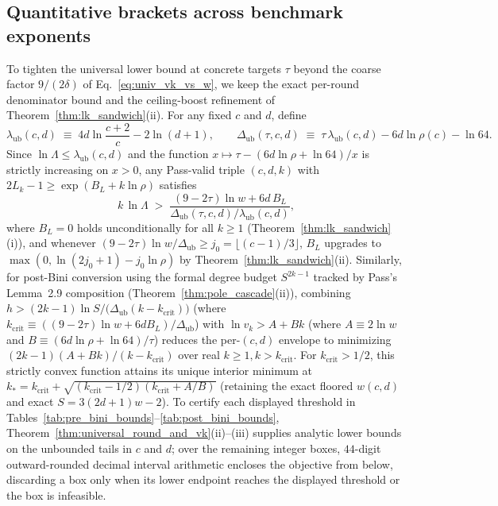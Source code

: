 \documentclass[11pt,a4paper]{article}
\theoremstyle{plain}
\theoremstyle{definition}
\theoremstyle{remark}
\begin{document}
\subsection{Quantitative brackets across benchmark exponents}
\label{subsec:quantitative_tables}

To tighten the universal lower bound at concrete targets $\tau$ beyond the coarse factor $9/(2\delta)$ of Eq.~\eqref{eq:univ_vk_vs_w}, we keep the exact per-round denominator bound and the ceiling-boost refinement of Theorem~\ref{thm:lk_sandwich}(ii). For any fixed $c$ and $d$, define
\begin{equation}
    \lambda_{\mathrm{ub}}(c, d) \;\equiv\; 4d\ln\frac{c + 2}{c} - 2\ln(d + 1), \qquad \Delta_{\mathrm{ub}}(\tau, c, d) \;\equiv\; \tau\,\lambda_{\mathrm{ub}}(c, d) - 6d\ln\rho(c) - \ln 64 .
    \label{eq:sharp_denom}
\end{equation}
Since $\ln\Lambda \le \lambda_{\mathrm{ub}}(c, d)$ and the function $x \mapsto \tau - (6d\ln\rho + \ln 64)/x$ is strictly increasing on $x > 0$, any Pass-valid triple $(c, d, k)$ with $2 L_k - 1 \ge \exp(B_L + k\ln\rho)$ satisfies
\begin{equation}
    k\,\ln\Lambda \;>\; \frac{(9 - 2\tau)\ln w + 6d\,B_L}{\Delta_{\mathrm{ub}}(\tau, c, d) / \lambda_{\mathrm{ub}}(c, d)} ,
    \label{eq:sharp_k_lnLam_lb}
\end{equation}
where $B_L = 0$ holds unconditionally for all $k \ge 1$ (Theorem~\ref{thm:lk_sandwich}(i)), and whenever $(9 - 2\tau)\ln w / \Delta_{\mathrm{ub}} \ge j_0 = \lfloor (c - 1)/3 \rfloor$, $B_L$ upgrades to $\max(0, \ln(2 j_0 + 1) - j_0\ln\rho)$ by Theorem~\ref{thm:lk_sandwich}(ii). Similarly, for post-Bini conversion using the formal degree budget $S^{2k - 1}$ tracked by Pass's Lemma~2.9 composition (Theorem~\ref{thm:pole_cascade}(ii)), combining $h > (2k - 1)\ln S / \bigl(\Delta_{\mathrm{ub}}(k - k_{\mathrm{crit}})\bigr)$ (where $k_{\mathrm{crit}} \equiv ((9 - 2\tau)\ln w + 6d B_L)/\Delta_{\mathrm{ub}}$) with $\ln v_k > A + B k$ (where $A \equiv 2\ln w$ and $B \equiv (6d\ln\rho + \ln 64)/\tau$) reduces the per-$(c, d)$ envelope to minimizing $(2k - 1)(A + B k)/(k - k_{\mathrm{crit}})$ over real $k \ge 1, k > k_{\mathrm{crit}}$. For $k_{\mathrm{crit}} > 1/2$, this strictly convex function attains its unique interior minimum at $k_* = k_{\mathrm{crit}} + \sqrt{(k_{\mathrm{crit}} - 1/2)(k_{\mathrm{crit}} + A/B)}$ (retaining the exact floored $w(c, d)$ and exact $S = 3(2d + 1)w - 2$). To certify each displayed threshold in Tables~\ref{tab:pre_bini_bounds}--\ref{tab:post_bini_bounds}, Theorem~\ref{thm:universal_round_and_vk}(ii)--(iii) supplies analytic lower bounds on the unbounded tails in $c$ and $d$; over the remaining integer boxes, $44$-digit outward-rounded decimal interval arithmetic encloses the objective from below, discarding a box only when its lower endpoint reaches the displayed threshold or the box is infeasible.
\end{document}
